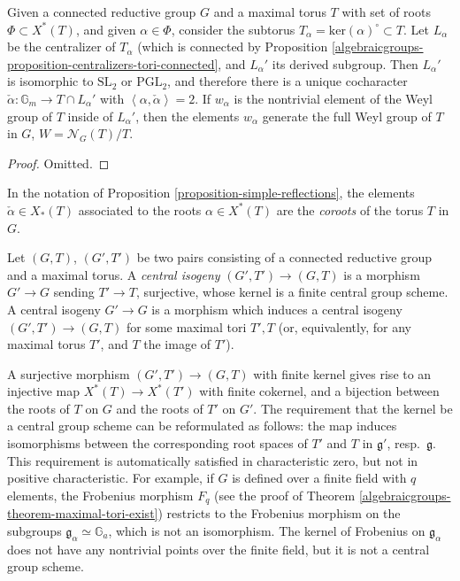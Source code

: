 \begin{proposition}
\label{proposition-simple-reflections}
 Given a connected reductive group $G$ and a maximal torus $T$ with set of roots $\Phi\subset X^*(T)$, and given $\alpha\in \Phi$, consider the subtorus $T_\alpha=\text{ker}(\alpha)^\circ\subset T$. Let $L_\alpha$ be the centralizer of $T_\alpha$ (which is connected by Proposition \ref{algebraicgroups-proposition-centralizers-tori-connected}, and $L_\alpha'$ its derived subgroup. Then $L_\alpha'$ is isomorphic to $\text{SL}_2$ or $\text{PGL}_2$, and therefore there is a unique cocharacter $\check\alpha:\mathbb G_m\to T\cap L_{\alpha}'$ with $\left< \alpha, \check\alpha\right>=2$. If $w_\alpha$ is the nontrivial element of the Weyl group of $T$ inside of $L_\alpha'$, then the elements $w_\alpha$ generate the full Weyl group of $T$ in $G$, $W = \mathcal N_G(T)/T$.
\end{proposition}

\begin{proof}
 Omitted.
\end{proof}

\begin{definition}
 \label{definition-coroots-group}
In the notation of Proposition \ref{proposition-simple-reflections}, the elements $\check\alpha\in X_*(T)$ associated to the roots $\alpha\in X^*(T)$ are the {\it coroots} of the torus $T$ in $G$.
\end{definition}


\begin{definition}
\label{definition-central-isogeny}
 Let $(G,T)$, $(G',T')$ be two pairs consisting of a connected reductive group and a maximal torus. A {\it central isogeny} $(G',T')\to (G,T)$ is a morphism $G'\to G$ sending $T'\to T$, surjective, whose kernel is a finite central group scheme. A central isogeny $G'\to G$ is a morphism  which induces a central isogeny $(G',T')\to (G,T)$ for some maximal tori $T', T$ (or, equivalently, for any maximal torus $T'$, and $T$ the image of $T'$). 
\end{definition}

\begin{remark}
 \label{remark-on-central-isogenies}
A surjective morphism $(G',T')\to (G,T)$ with finite kernel gives rise to an injective map $X^*(T)\to X^*(T')$ with finite cokernel, and a bijection between the roots of $T$ on $G$ and the roots of $T'$ on $G'$. The requirement that the kernel be a central group scheme can be reformulated as follows: the map induces isomorphisms between the corresponding root spaces of $T'$ and $T$ in $\mathfrak g'$, resp.\ $\mathfrak g$.
This requirement is automatically satisfied in characteristic zero, but not in positive characteristic. For example, if $G$ is defined over a finite field with $q$ elements, the Frobenius morphism $F_q$ (see the proof of Theorem \ref{algebraicgroups-theorem-maximal-tori-exist}) restricts to the Frobenius morphism on the subgroups $\mathfrak g_\alpha\simeq \mathbb G_a$, which is not an isomorphism. The kernel of Frobenius on $\mathfrak g_\alpha$ does not have any nontrivial points over the finite field, but it is not a central group scheme. 
\end{remark}


